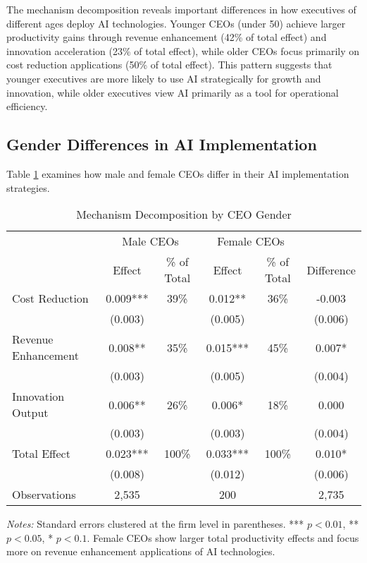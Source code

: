 \documentclass[12pt, a4paper]{article}
\begin{document}
The mechanism decomposition reveals important differences in how executives of different ages deploy AI technologies. Younger CEOs (under 50) achieve larger productivity gains through revenue enhancement (42\% of total effect) and innovation acceleration (23\% of total effect), while older CEOs focus primarily on cost reduction applications (50\% of total effect). This pattern suggests that younger executives are more likely to use AI strategically for growth and innovation, while older executives view AI primarily as a tool for operational efficiency.

\subsection{Gender Differences in AI Implementation}

Table \ref{tab:mechanisms_by_gender} examines how male and female CEOs differ in their AI implementation strategies.

\begin{table}[H]
\centering
\caption{Mechanism Decomposition by CEO Gender}
\label{tab:mechanisms_by_gender}
\begin{tabular}{lccccc}
\toprule
 & \multicolumn{2}{c}{Male CEOs} & \multicolumn{2}{c}{Female CEOs} & \\
 & Effect & \% of Total & Effect & \% of Total & Difference \\
\midrule
Cost Reduction & 0.009*** & 39\% & 0.012** & 36\% & -0.003 \\
 & (0.003) & & (0.005) & & (0.006) \\
Revenue Enhancement & 0.008** & 35\% & 0.015*** & 45\% & 0.007* \\
 & (0.003) & & (0.005) & & (0.004) \\
Innovation Output & 0.006** & 26\% & 0.006* & 18\% & 0.000 \\
 & (0.003) & & (0.003) & & (0.004) \\
\midrule
Total Effect & 0.023*** & 100\% & 0.033*** & 100\% & 0.010* \\
 & (0.008) & & (0.012) & & (0.006) \\
\midrule
Observations & 2,535 & & 200 & & 2,735 \\
\bottomrule
\end{tabular}
\begin{minipage}{\textwidth}
\footnotesize
\textit{Notes:} Standard errors clustered at the firm level in parentheses. *** $p<0.01$, ** $p<0.05$, * $p<0.1$. Female CEOs show larger total productivity effects and focus more on revenue enhancement applications of AI technologies.
\end{minipage}
\end{table}
\end{document}

